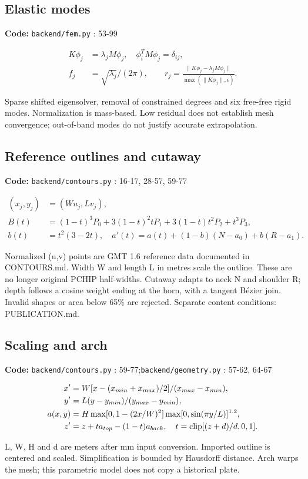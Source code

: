 \documentclass[10pt,a4paper]{article}
\newcommand{\loc}[1]{{\small\color{ink}\textbf{Code:} #1\par}}
\begin{document}
\begin{samepage}\subsection{Elastic modes}
\loc{\texttt{backend/fem.py} : 53-99}
\begin{align}K\phi_j&=\lambda_j M\phi_j,\quad\phi_i^TM\phi_j=\delta_{ij},\\
f_j&=\sqrt{\lambda_j}/(2\pi),\qquad r_j=\frac{\|K\phi_j-\lambda_jM\phi_j\|}{\max(\|K\phi_j\|,\epsilon)}.\end{align}

Sparse shifted eigensolver, removal of constrained degrees and six free-free rigid modes. Normalization is mass-based. Low residual does not establish mesh convergence; out-of-band modes do not justify accurate extrapolation.\par
\end{samepage}
\begin{samepage}\subsection{Reference outlines and cutaway}
\loc{\texttt{backend/contours.py} : 16-17, 28-57, 59-77}
\begin{align}(x_j,y_j)&=(W u_j,L v_j),\\B(t)&=(1-t)^3P_0+3(1-t)^2tP_1+3(1-t)t^2P_2+t^3P_3,\\b(t)&=t^2(3-2t),\quad a\prime(t)=a(t)+(1-b)(N-a_0)+b(R-a_1).\end{align}

Normalized (u,v) points are GMT 1.6 reference data documented in CONTOURS.md. Width W and length L in metres scale the outline. These are no longer original PCHIP half-widths. Cutaway adapts to neck N and shoulder R; depth follows a cosine weight ending at the horn, with a tangent Bézier join. Invalid shapes or area below 65\% are rejected. Separate content conditions: PUBLICATION.md.\par
\end{samepage}
\begin{samepage}\subsection{Scaling and arch}
\loc{\texttt{backend/contours.py} : 59-77;\allowbreak\quad \texttt{backend/geometry.py} : 57-62, 64-67}
\begin{align}x'&=W[x-(x_{min}+x_{max})/2]/(x_{max}-x_{min}),\\
y'&=L(y-y_{min})/(y_{max}-y_{min}),\\
a(x,y)&=H\max[0,1-(2x/W)^2]\max[0,\sin(\pi y/L)]^{1.2},\\
z'&=z+t a_{top}-(1-t)a_{back},\quad t=\operatorname{clip}[(z+d)/d,0,1].\end{align}

L, W, H and d are meters after mm input conversion. Imported outline is centered and scaled. Simplification is bounded by Hausdorff distance. Arch warps the mesh; this parametric model does not copy a historical plate.\par
\end{samepage}
\end{document}
